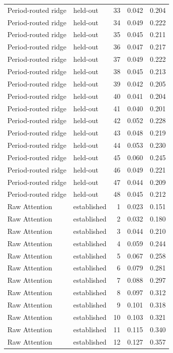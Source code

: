 \begin{tabular}{llrrr}
Period-routed ridge & held-out & 33 & 0.042 & 0.204 \\
Period-routed ridge & held-out & 34 & 0.049 & 0.222 \\
Period-routed ridge & held-out & 35 & 0.045 & 0.211 \\
Period-routed ridge & held-out & 36 & 0.047 & 0.217 \\
Period-routed ridge & held-out & 37 & 0.049 & 0.222 \\
Period-routed ridge & held-out & 38 & 0.045 & 0.213 \\
Period-routed ridge & held-out & 39 & 0.042 & 0.205 \\
Period-routed ridge & held-out & 40 & 0.041 & 0.204 \\
Period-routed ridge & held-out & 41 & 0.040 & 0.201 \\
Period-routed ridge & held-out & 42 & 0.052 & 0.228 \\
Period-routed ridge & held-out & 43 & 0.048 & 0.219 \\
Period-routed ridge & held-out & 44 & 0.053 & 0.230 \\
Period-routed ridge & held-out & 45 & 0.060 & 0.245 \\
Period-routed ridge & held-out & 46 & 0.049 & 0.221 \\
Period-routed ridge & held-out & 47 & 0.044 & 0.209 \\
Period-routed ridge & held-out & 48 & 0.045 & 0.212 \\
Raw Attention & established & 1 & 0.023 & 0.151 \\
Raw Attention & established & 2 & 0.032 & 0.180 \\
Raw Attention & established & 3 & 0.044 & 0.210 \\
Raw Attention & established & 4 & 0.059 & 0.244 \\
Raw Attention & established & 5 & 0.067 & 0.258 \\
Raw Attention & established & 6 & 0.079 & 0.281 \\
Raw Attention & established & 7 & 0.088 & 0.297 \\
Raw Attention & established & 8 & 0.097 & 0.312 \\
Raw Attention & established & 9 & 0.101 & 0.318 \\
Raw Attention & established & 10 & 0.103 & 0.321 \\
Raw Attention & established & 11 & 0.115 & 0.340 \\
Raw Attention & established & 12 & 0.127 & 0.357 \\

\end{tabular}
